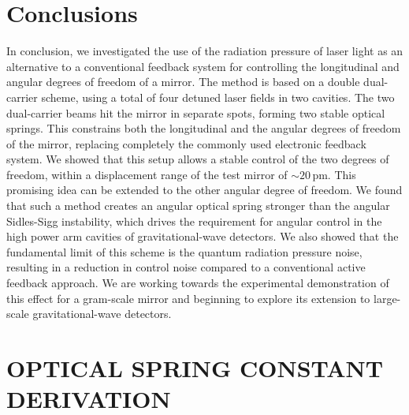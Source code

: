 \section{Conclusions}
In conclusion, we investigated the use of the radiation pressure of laser light as an alternative to a conventional feedback system for controlling the 
longitudinal and angular degrees of freedom of a mirror.
The method is based on a double dual-carrier scheme, using a total of four detuned laser fields in two cavities. 
The two dual-carrier beams hit the mirror in separate spots, forming two stable optical springs.
This constrains both the longitudinal and the angular degrees of freedom of the mirror, replacing completely the commonly used electronic feedback system.
We showed that this setup allows a stable control of the two degrees of freedom, within a displacement range of the test mirror of $\sim 20\,$pm. This promising idea can be extended to the other angular degree of freedom.
We found that such a method creates an angular optical spring stronger than the angular Sidles-Sigg instability, which drives the requirement for angular control in the high power arm cavities of gravitational-wave detectors. We also showed that the fundamental limit of this scheme is the quantum radiation pressure noise, resulting in a reduction in control noise compared to a conventional active feedback approach. 
We are working towards the experimental demonstration of this effect for a gram-scale mirror and beginning to explore its extension
to large-scale gravitational-wave detectors.

\section{OPTICAL SPRING CONSTANT DERIVATION}
\label{app:A} 

